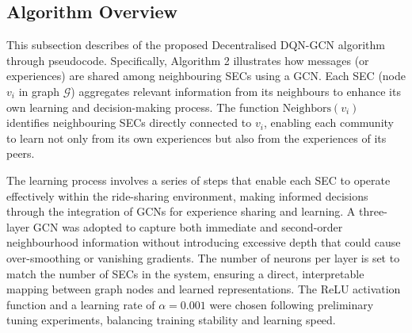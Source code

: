 \subsection{Algorithm Overview}
This subsection describes of the proposed Decentralised DQN-GCN algorithm through pseudocode. Specifically, Algorithm 2 illustrates how messages (or experiences) are shared among neighbouring SECs using a GCN. Each SEC (node \( v_i \) in graph \( \mathcal{G} \)) aggregates relevant information from its neighbours to enhance its own learning and decision-making process. The function \(\text{Neighbors}(v_i)\) identifies neighbouring SECs directly connected to \( v_i \), enabling each community to learn not only from its own experiences but also from the experiences of its peers.



The learning process involves a series of steps that enable each SEC to operate effectively within the ride-sharing environment, making informed decisions through the integration of GCNs for experience sharing and learning. A three-layer GCN was adopted to capture both immediate and second-order neighbourhood information without introducing excessive depth that could cause over-smoothing or vanishing gradients. The number of neurons per layer is set to match the number of SECs in the system, ensuring a direct, interpretable mapping between graph nodes and learned representations. The ReLU activation function and a learning rate of $\alpha = 0.001$ were chosen following preliminary tuning experiments, balancing training stability and learning speed.

